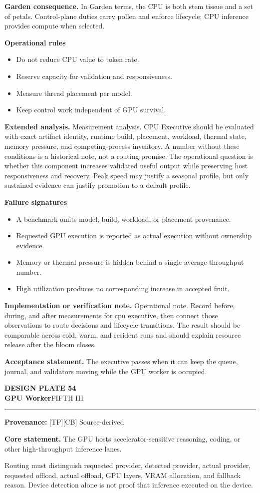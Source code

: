 \documentclass[10pt,letterpaper,oneside]{article}
\newcommand{\prov}[1]{\textcolor{gardenBlue}{\sffamily\footnotesize\textbf{Provenance:} #1}}
\newcommand{\platetitle}[3]{%
  \begin{minipage}[t][0.54in][t]{\textwidth}
  {\sffamily\bfseries\color{gardenDeep}\fontsize{9}{10}\selectfont DESIGN PLATE #1}\\[-1pt]
  {\sffamily\bfseries\color{gardenInk}\fontsize{16.5}{18}\selectfont #2}\hfill{\sffamily\color{gardenGreen}\large #3}
  \end{minipage}\vspace{-2pt}\hrule\vspace{5pt}}
\begin{document}
\textbf{Garden consequence.} In Garden terms, the CPU is both stem tissue and a set of petals. Control-plane duties carry pollen and enforce lifecycle; CPU inference provides compute when selected.

\textbf{Operational rules}
\begin{itemize}
\item Do not reduce CPU value to token rate.
\item Reserve capacity for validation and responsiveness.
\item Measure thread placement per model.
\item Keep control work independent of GPU survival.
\end{itemize}
\textbf{Extended analysis.} Measurement analysis. CPU Executive should be evaluated with exact artifact identity, runtime build, placement, workload, thermal state, memory pressure, and competing-process inventory. A number without these conditions is a historical note, not a routing promise. The operational question is whether this component increases validated useful output while preserving host responsiveness and recovery. Peak speed may justify a seasonal profile, but only sustained evidence can justify promotion to a default profile.

\textbf{Failure signatures}
\begin{itemize}
\item A benchmark omits model, build, workload, or placement provenance.
\item Requested GPU execution is reported as actual execution without ownership evidence.
\item Memory or thermal pressure is hidden behind a single average throughput number.
\item High utilization produces no corresponding increase in accepted fruit.
\end{itemize}
\textbf{Implementation or verification note.} Operational note. Record before, during, and after measurements for cpu executive, then connect those observations to route decisions and lifecycle transitions. The result should be comparable across cold, warm, and resident runs and should explain resource release after the bloom closes.

\begin{acceptbox}
\textbf{Acceptance statement.} The executive passes when it can keep the queue, journal, and validators moving while the GPU worker is occupied.
\end{acceptbox}
\newpage
\platetitle{54}{GPU Worker}{FIFTH III}
\prov{[TP][CB] Source-derived}
\fontsize{8.85}{10.45}\selectfont
\begin{corebox}
\textbf{Core statement.} The GPU hosts accelerator-sensitive reasoning, coding, or other high-throughput inference lanes.
\end{corebox}
Routing must distinguish requested provider, detected provider, actual provider, requested offload, actual offload, GPU layers, VRAM allocation, and fallback reason. Device detection alone is not proof that inference executed on the device.
\end{document}
